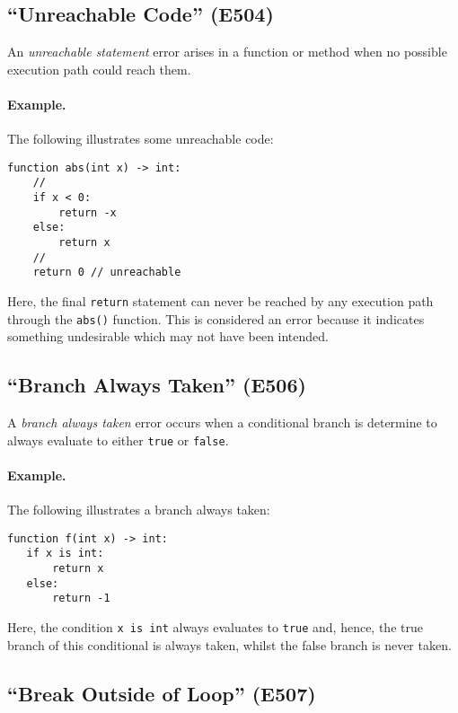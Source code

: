 \subsection{``Unreachable Code'' (E504)}

An {\em unreachable statement} error arises in a function or method when no possible execution path could reach them.  

\paragraph{Example.} The following illustrates some unreachable code:

\begin{lstlisting}
function abs(int x) -> int:
    //
    if x < 0:
        return -x
    else:
        return x
    //
    return 0 // unreachable
\end{lstlisting}

Here, the final \lstinline{return} statement can never be reached by any execution path through the \lstinline{abs()} function.  This is considered an error because it indicates something undesirable which may not have been intended.

\subsection{``Branch Always Taken'' (E506)}

A {\em branch always taken} error occurs when a conditional branch is determine to always evaluate to either \lstinline{true} or \lstinline{false}.  

\paragraph{Example.} The following illustrates a branch always taken:

\begin{lstlisting}
function f(int x) -> int:
   if x is int:
       return x
   else:
       return -1
\end{lstlisting}

Here, the condition \lstinline{x is int} always evaluates to \lstinline{true} and, hence, the true branch of this conditional is always taken, whilst the false branch is never taken.

\subsection{``Break Outside of Loop'' (E507)}

